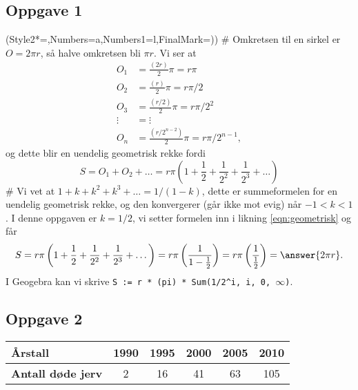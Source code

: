\subsection*{Oppgave 1}
\begin{easylist}[enumerate]
\ListProperties(Style2*=,Numbers=a,Numbers1=l,FinalMark={)})
# Omkretsen til en sirkel er $O = 2 \pi r$, så halve omkretsen bli $\pi r$.
Vi ser at 
\begin{align*}
	O_1 &=  \frac{(2r)}{2} \pi = r \pi \\
	O_2 &=  \frac{(r)}{2} \pi = r \pi /2 \\
	O_3 &=  \frac{(r/2)}{2} \pi = r \pi / 2^2 \\
	\vdots &= \vdots \\
	O_n &=  \frac{(r/2^{n-2})}{2} \pi = r \pi / 2^{n-1},
\end{align*}
og dette blir en uendelig geometrisk rekke fordi
\begin{equation}
\label{eqn:geometrisk}
	S = O_1 + O_2  + \dots =  r \pi \left( 1 + \frac{1}{2} + 
	\frac{1}{2^2} + \frac{1}{2^3} + \dots \right)
\end{equation}
# Vi vet at $1 + k + k^2 + k^3 + \dots = 1/ (1-k)$, dette er summeformelen for en uendelig geometrisk rekke, og den konvergerer (går ikke mot evig) når $-1 < k < 1$. I denne oppgaven er $k = 1/2$, vi setter formelen inn i likning \eqref{eqn:geometrisk} og får 
\begin{equation*}
S =  r \pi \left( 1 + \frac{1}{2} + 
\frac{1}{2^2} + \frac{1}{2^3} + \dots \right)
=  r \pi \left( \frac{1}{1 - \frac{1}{2}} \right)
=  r \pi \left( \frac{1}{\frac{1}{2}} \right)
 = \answer{2 \pi r}.
\end{equation*}
I Geogebra kan vi skrive \verb|S := r * (pi) * Sum(1/2^i, i, 0, |$\infty$\verb|)|.
\end{easylist}

\subsection*{Oppgave 2}

\begin{center}
	\begin{tabular}{|l|c|c|c|c|c|}
		\hline
		\textbf{Årstall} & 1990 & 1995 & 2000 & 2005 & 2010 \\ \hline
		\textbf{Antall døde jerv} & 2 & 16 & 41 & 63 & 105 \\ \hline
	\end{tabular}
\end{center}


